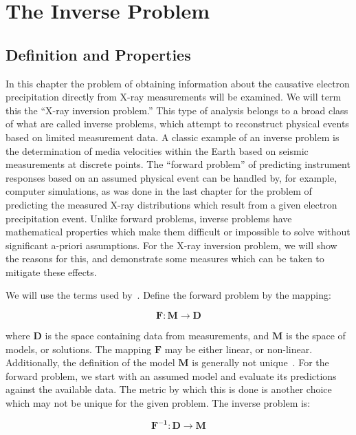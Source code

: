\chapter{The Inverse Problem}

\section{Definition and Properties}

In this chapter the problem of obtaining information about the causative electron precipitation directly from X-ray measurements will be examined. We will term this the ``X-ray inversion problem.'' This type of analysis belongs to a broad class of what are called inverse problems, which attempt to reconstruct physical events based on limited measurement data.  A classic example of an inverse problem is the determination of media velocities within the Earth based on seismic measurements at discrete points. The ``forward problem'' of predicting instrument responses based on an assumed physical event can be handled by, for example, computer simulations, as was done in the last chapter for the problem of predicting the measured X-ray distributions which result from a given electron precipitation event. Unlike forward problems, inverse problems have mathematical properties which make them difficult or impossible to solve without  significant a-priori assumptions. For the X-ray inversion problem, we will show the reasons for this, and demonstrate some measures which can be taken to mitigate these effects.

We will use the terms used by~\citep{Tarantola2004}. Define the forward problem by the mapping:

\begin{equation}
\mathbf{F}:\mathbf{M} \rightarrow \mathbf{D}
\end{equation}

where $\mathbf{D}$ is the space containing data from measurements, and $\mathbf{M}$ is the space of models, or solutions. The mapping $\mathbf{F}$ may be either linear, or non-linear. Additionally, the definition of the model $\mathbf{M}$ is generally not unique~\citep{Tarantola2004}. For the forward problem, we start with an assumed model and evaluate its predictions against the available data. The metric by which this is done is another choice which may not be unique for the given problem. The inverse problem is:

\begin{equation}
\mathbf{F^{-1}}:\mathbf{D} \rightarrow \mathbf{M}
\end{equation}

